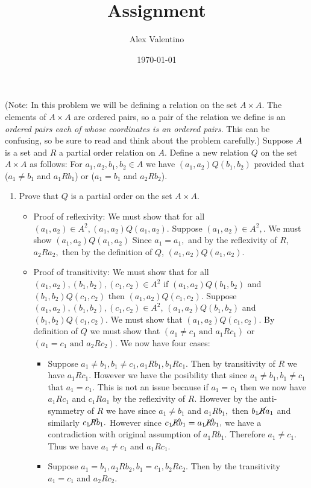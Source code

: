 \documentclass[12pt, letterpaper]{article}
\date{\today}
\author{Alex Valentino}
\title{Assignment }
\begin{document}
	(Note: In this problem we will be defining a relation on the set $A \times A$.
The elements of $A \times A$ are ordered pairs, so a pair of the relation we define is
an {\em ordered pairs each of whose coordinates is an ordered pairs}. This can be confusing,
so be sure to read and think about the problem carefully.)  Suppose $A$ is a set and $R$ a partial order relation on $A$.
Define a new relation $Q$ on the set $A \times A$ as follows:
For $a_1,a_2,b_1,b_2 \in A$ we have
$(a_1,a_2)Q(b_1,b_2)$ provided that ($a_1 \neq b_1$ and $a_1Rb_1$)  or
($a_1=b_1$ and $a_2Rb_2$). 
\begin{enumerate}
\item Prove that $Q$ is a partial order
on the set $A \times A$.  \\
	\begin{itemize}
		\item Proof of reflexivity: We must show that for all $(a_1 , a_2) \in A^2, (a_1,a_2)Q(a_1,a_2).$  Suppose $(a_1 , a_2) \in A^2,$.  We must show $(a_1 , a_2) Q (a_1 , a_2)$  Since $a_1 = a_1,$ and by the reflexivity of $R$, $a_2 R a_2,$ then by the definition of $Q$,    $(a_1 , a_2) Q (a_1 , a_2)$.
		\item Proof of transitivity:  We must show that for all $(a_1,a_2),(b_1,b_2),(c_1,c_2) \in A^2$ if $(a_1,a_2)Q(b_1,b_2)$ and $(b_1,b_2)Q(c_1,c_2)$ then $(a_1,a_2)Q(c_1,c_2).$  Suppose $(a_1,a_2),(b_1,b_2),(c_1,c_2) \in A^2$, $(a_1,a_2)Q(b_1,b_2)$ and $(b_1,b_2)Q(c_1,c_2)$.  We must show that $(a_1,a_2)Q(c_1,c_2).$  By definition of $Q$ we must show that $(a_1 \neq c_1 \text{ and } a_1 R c_1)$ or $(a_1 = c_1 \text{ and } a_2 R c_2)$. We now have four cases:
		\begin{itemize}
			\item Suppose $a_1 \neq b_1, b_1 \neq c_1, a_1 R b_1, b_1 R c_1.$  Then by transitivity of $R$ we have $a_1 R c_1.$  However we have the posibility that since $a_1 \neq b_1, b_1 \neq c_1$ that $a_1 = c_1.$  This is not an issue because if $a_1 = c_1$ then we now have $a_1 R c_1$ and $c_1 R a_1$ by the reflexivity of $R$.  However by the anti-symmetry of $R$ we have since $a_1 \neq b_1$ and $a_1 R b_1,$ then $b_1 \cancel{R} a_1$ and similarly $c_1 \cancel{R} b_1.$  However since $c_1 \cancel{R} b_1 = a_1 \cancel{R} b_1,$ we have a contradiction with original assumption of $a_1 R b_1.$  Therefore $a_1 \neq c_1.$  Thus we have $a_1 \neq c_1$ and $a_1 R c_1.$
			\item Suppose $a_1 = b_1, a_2 R b_2, b_1 = c_1, b_2 R c_2.$  Then by the transitivity $a_1 = c_1$ and $a_2 R c_2.$

\end{itemize}
\end{itemize}
\end{enumerate}
\end{document}

